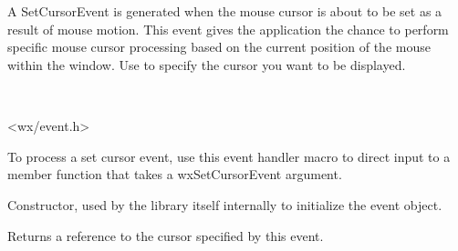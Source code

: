 \section{}\label{wxsetcursorevent}

A SetCursorEvent is generated when the mouse cursor is about to be set as a
result of mouse motion. This event gives the application the chance to perform
specific mouse cursor processing based on the current position of the mouse
within the window. Use  to
specify the cursor you want to be displayed.


\\


<wx/event.h>




To process a set cursor event, use this event handler macro to direct input to a member
function that takes a wxSetCursorEvent argument.

\twocolwidtha{7cm}
\begin{twocollist}\itemsep=0pt
\end{twocollist}%




\label{wxsetcursoreventctor}


Constructor, used by the library itself internally to initialize the event
object.


\label{wxsetcursoreventgetcursor}


Returns a reference to the cursor specified by this event.


\label{wxsetcursoreventgetx}


